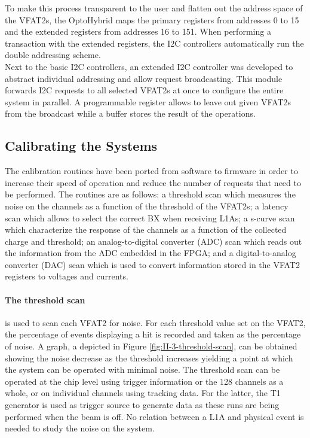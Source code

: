       To make this process transparent to the user and flatten out the address space of the VFAT2s, the OptoHybrid maps the primary registers from addresses 0 to 15 and the extended registers from addresses 16 to 151. When performing a transaction with the extended registers, the I2C controllers automatically run the double addressing scheme. \\

      Next to the basic I2C controllers, an extended I2C controller was developed to abstract individual addressing and allow request broadcasting. This module forwards I2C requests to all selected VFAT2s at once to configure the entire system in parallel. A programmable register allows to leave out given VFAT2s from the broadcast while a buffer stores the result of the operations.

    \subsection{Calibrating the Systems}

      The calibration routines have been ported from software to firmware in order to increase their speed of operation and reduce the number of requests that need to be performed. The routines are as follows: a threshold scan which measures the noise on the channels as a function of the threshold of the VFAT2s; a latency scan which allows to select the correct BX when receiving L1As; a s-curve scan which characterize the response of the channels as a function of the collected charge and threshold; an analog-to-digital converter (ADC) scan which reads out the information from the ADC embedded in the FPGA; and a digital-to-analog converter (DAC) scan which is used to convert information stored in the VFAT2 registers to voltages and currents.

      \paragraph{The threshold scan} is used to scan each VFAT2 for noise. For each threshold value set on the VFAT2, the percentage of events displaying a hit is recorded and taken as the percentage of noise. A graph, a depicted in Figure \ref{fig:II-3-threshold-scan}, can be obtained showing the noise decrease as the threshold increases yielding a point at which the system can be operated with minimal noise. The threshold scan can be operated at the chip level using trigger information or the 128 channels as a whole, or on individual channels using tracking data. For the latter, the T1 generator is used as trigger source to generate data as these runs are being performed when the beam is off. No relation between a L1A and physical event is needed to study the noise on the system.

